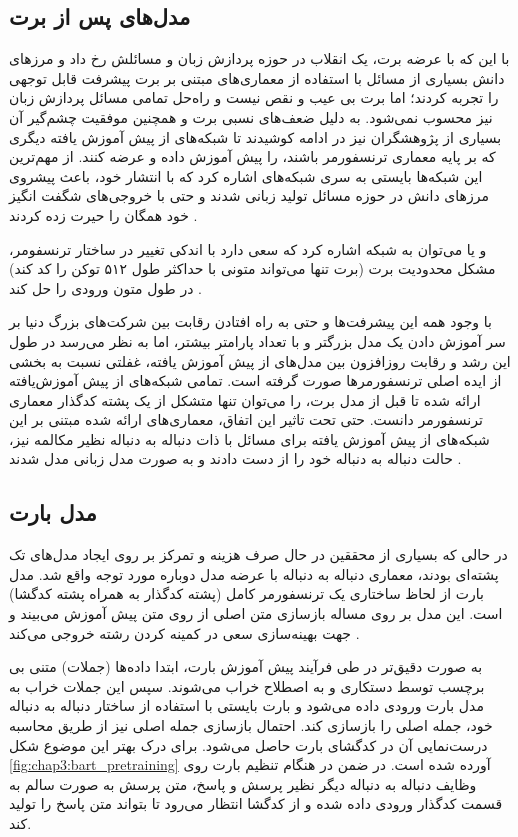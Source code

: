 \subsection{مدل‌های پس از برت}
با این که با عرضه برت، یک انقلاب در حوزه پردازش زبان و مسائلش رخ داد و مرز‌های دانش بسیاری از مسائل با استفاده از معماری‌های مبتنی بر برت پیشرفت قابل توجهی را تجربه کردند؛ اما برت بی عیب و نقص نیست و راه‌حل تمامی مسائل پردازش زبان نیز محسوب نمی‌شود. به دلیل ضعف‌های نسبی برت و همچنین موفقیت چشم‌گیر آن بسیاری از پژوهشگران نیز در ادامه کوشیدند تا شبکه‌های از پیش آموزش یافته دیگری که بر پایه معماری ترنسفورمر باشند، را پیش آموزش داده و عرضه کنند.
از مهم‌ترین این شبکه‌ها بایستی به سری شبکه‌های 
اشاره کرد که با انتشار خود، باعث پیشروی مرز‌های دانش در حوزه مسائل تولید زبانی شدند و حتی با خروجی‌های شگفت انگیز خود همگان را حیرت زده کردند
\cite{gpt2_paper, gpt3_paper}.

و یا می‌توان به شبکه
اشاره کرد که سعی دارد با اندکی تغییر در ساختار ترنسفومر، مشکل محدودیت برت 
(برت تنها می‌تواند متونی با حداکثر طول ۵۱۲ توکن را کد کند)
در طول متون ورودی را حل کند
\cite{DBLP:journals/corr/abs-1901-02860}.

با وجود همه این پیشرفت‌ها و حتی به راه افتادن رقابت بین شرکت‌های بزرگ دنیا بر سر آموزش دادن یک مدل بزرگتر و با تعداد پارامتر بیشتر، اما به نظر می‌رسد در طول این رشد و رقابت روزافزون بین مدل‌های از پیش آموزش یافته، غفلتی نسبت به بخشی از ایده اصلی ترنسفورمر‌ها صورت گرفته است. تمامی شبکه‌های از پیش آموز‌ش‌یافته ارائه شده تا قبل از مدل برت، را می‌توان تنها متشکل از یک پشته کدگذار معماری ترنسفورمر دانست. حتی تحت تاثیر این اتفاق، معماری‌های ارائه شده مبتنی بر این شبکه‌های از پیش آموزش یافته برای مسائل با ذات دنباله به دنباله نظیر مکالمه نیز، حالت دنباله به دنباله خود را از دست دادند و به صورت مدل زبانی مدل شدند
\cite{zhang2019dialogpt}.


\subsection{مدل بارت}
در حالی که بسیاری از محققین در حال صرف هزینه و تمرکز بر روی ایجاد مدل‌های تک پشته‌ای بودند، معماری دنباله به دنباله با عرضه مدل 
دوباره مورد توجه واقع شد. مدل بارت از لحاظ ساختاری یک ترنسفورمر کامل (پشته کدگذار به همراه پشته کدگشا) است. این مدل بر روی مساله بازسازی متن اصلی از روی متن 
پیش آموزش می‌بیند و جهت بهینه‌سازی سعی در کمینه‌ کردن 
رشته خروجی می‌کند
\cite{lewis2019bart}.
 
 به صورت دقیق‌تر در طی فرآیند پیش‌‌‌ آموزش بارت، ابتدا داده‌‌ها (جملات) متنی بی برچسب توسط 
دستکاری و به اصطلاح خراب می‌شوند. سپس این جملات خراب به مدل بارت ورودی داده می‌شود و بارت بایستی با استفاده از ساختار دنباله به دنباله خود، جمله اصلی را بازسازی کند. احتمال بازسازی جمله اصلی نیز از طریق محاسبه درست‌نمایی آن در کدگشای بارت حاصل می‌شود. برای درک بهتر این موضوع شکل
\ref{fig:chap3:bart_pretraining}
آورده شده است. در ضمن در هنگام تنظیم بارت روی وظایف دنباله به دنباله دیگر نظیر پرسش و پاسخ، متن پرسش به صورت سالم به قسمت کدگذار ورودی داده شده و از کدگشا انتظار می‌رود تا بتواند متن پاسخ را تولید کند.

